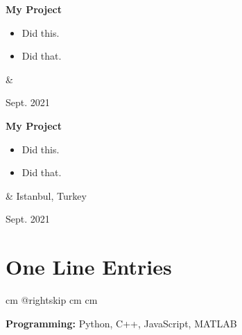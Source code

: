 \documentclass[10pt, letterpaper]{article}
\newenvironment{highlights}{
        \begin{itemize}[
                topsep=0pt,
                parsep=0.10 cm,
                partopsep=0pt,
                itemsep=0pt,
                after=\vspace{-1\baselineskip},
                leftmargin=0.4 cm + 3pt
            ]
    }{
        \end{itemize}
    } %
\let\originalTabularx\tabularx
\let\originalEndTabularx\endtabularx
\renewenvironment{tabularx}{\bgroup\centering\originalTabularx}{\originalEndTabularx\par\egroup}
\begin{document}
        \vspace{0.2 cm}
        \begin{tabularx}{
            \textwidth-0.4 cm-0.13cm
        }{
            K{0.2 cm}
            R{4.1 cm}
        }
            \textbf{My Project}

            \vspace{0.10 cm}

            \begin{highlights}
                \item Did this.
                \item Did that.
            \end{highlights}
            &
            

            Sept. 2021
        \end{tabularx}


        \vspace{0.2 cm}
        \begin{tabularx}{
            \textwidth-0.4 cm-0.13cm
        }{
            K{0.2 cm}
            R{4.1 cm}
        }
            \textbf{My Project}

            \vspace{0.10 cm}

            \begin{highlights}
                \item Did this.
                \item Did that.
            \end{highlights}
            &
            Istanbul, Turkey

            Sept. 2021
        \end{tabularx}



    
    \section{One Line Entries}

        \begingroup{} cm
        \advance\csname @rightskip cm
        \advance{} cm

        \textbf{Programming:} Python, C++, JavaScript, MATLAB
        \par\endgroup


    
\end{document}
